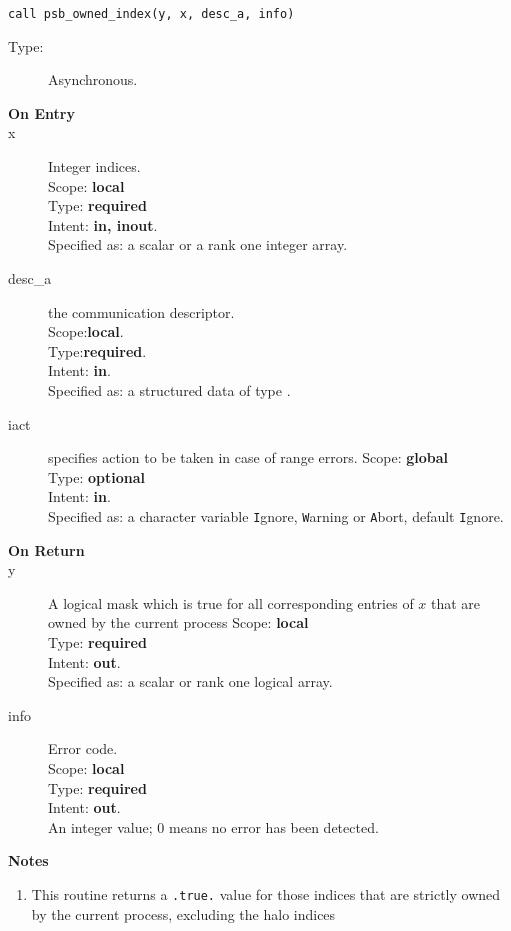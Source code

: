 \begin{verbatim}
call psb_owned_index(y, x, desc_a, info)
\end{verbatim}

\begin{description}
\item[Type:] Asynchronous.
\item[\bf On Entry]
\item[x] Integer indices.\\
Scope: {\bf local} \\
Type: {\bf required}\\
Intent: {\bf in, inout}.\\
Specified as: a scalar or a rank one integer array.\\
\item[desc\_a] the communication descriptor.\\
Scope:{\bf local}.\\
Type:{\bf required}.\\
Intent: {\bf in}.\\
Specified as: a structured data of type \descdata.
\item[iact] specifies action to be taken in case of range errors. 
Scope: {\bf global} \\
Type: {\bf optional}\\
Intent: {\bf in}.\\
Specified as: a character variable  \verb|I|gnore, \verb|W|arning or
\verb|A|bort, default \verb|I|gnore.
\end{description}

\begin{description}
\item[\bf On Return]
\item[y] A logical mask which is true for all corresponding entries of
  $x$ that are owned by the current process
Scope: {\bf local} \\
Type: {\bf required}\\
Intent: {\bf out}.\\
Specified as: a scalar or rank one logical array.
\item[info] Error code.\\
Scope: {\bf local} \\
Type: {\bf required} \\
Intent: {\bf out}.\\
An integer value; 0 means no error has been detected. 
\end{description}


{\par\noindent\large\bfseries Notes}
\begin{enumerate}
\item This routine returns a \verb|.true.| value for those indices
  that are strictly owned by the current process, excluding the halo
  indices
\end{enumerate}


